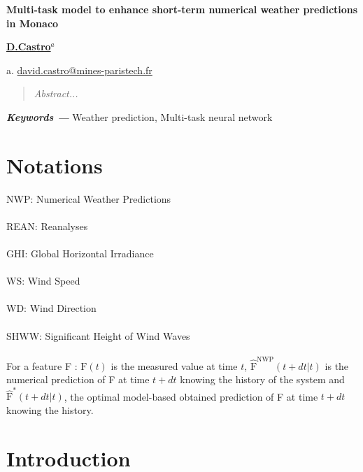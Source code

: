 \documentclass{article}
\providecommand{\keywords}[1]{\textbf{\textit{Keywords ---}} #1}
\newcommand{\saut}{\vspace{10px}}
\begin{document}
\begin{center}
    \begin{Large}\textbf{Multi-task model to enhance short-term numerical weather predictions in Monaco}\end{Large}
    
    \vspace{1cm}
    \begin{large}\textbf{\underline{D.Castro$^a$}}\end{large}
    
    \vspace{0.5cm}
    a. \href{mailto:david.castro@mines-paristech.fr}{david.castro@mines-paristech.fr}
    \vspace{1cm}
\end{center}

\begin{abstract}
\textit{Abstract...}
\end{abstract}

\saut

\keywords{Weather prediction, Multi-task neural network}

\section*{Notations}

NWP: Numerical Weather Predictions\\
\\
REAN: Reanalyses\\
\\
GHI: Global Horizontal Irradiance\\
\\
WS: Wind Speed\\
\\
WD: Wind Direction\\
\\
SHWW: Significant Height of Wind Waves\\
\\
For a feature F : $\mathrm F (t)$ is the measured value at time $t$, $\hat{\mathrm F}^\mathrm{NWP} (t + dt | t)$ is
the numerical prediction of F at time $t + dt$ knowing the history of the system
and $\hat{\mathrm F}^* (t + dt | t)$, the optimal model-based obtained prediction of F at time $t + dt$ knowing the history.

\section{Introduction}
\end{document}
